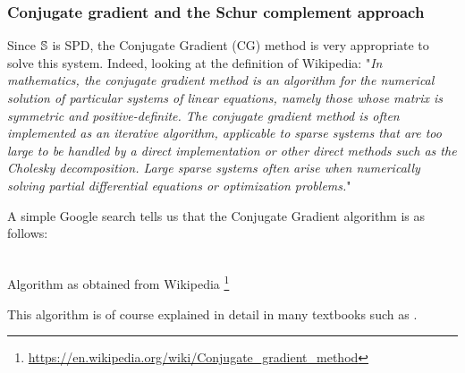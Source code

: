 \subsubsection{Conjugate gradient and the Schur complement approach }


 
Since ${\mathbb{S}}$ is SPD, the Conjugate Gradient (CG) method is very appropriate to solve this system. 
Indeed, looking at the definition of Wikipedia: "{\it In mathematics, the conjugate gradient method is an algorithm for the numerical solution of particular systems of linear equations, namely those whose matrix is symmetric and positive-definite. The conjugate gradient method is often implemented as an iterative algorithm, applicable to sparse systems that are too large to be handled by a direct implementation or other direct methods such as the Cholesky decomposition. Large sparse systems often arise when numerically solving partial differential equations or optimization problems.}"

A simple Google search tells us that the Conjugate Gradient algorithm is as follows:
\begin{center}
\\
Algorithm as obtained from Wikipedia \footnote{\url{https://en.wikipedia.org/wiki/Conjugate\_gradient\_method}}
\end{center}
This algorithm is of course explained in detail in many textbooks such as \cite{saad}.

